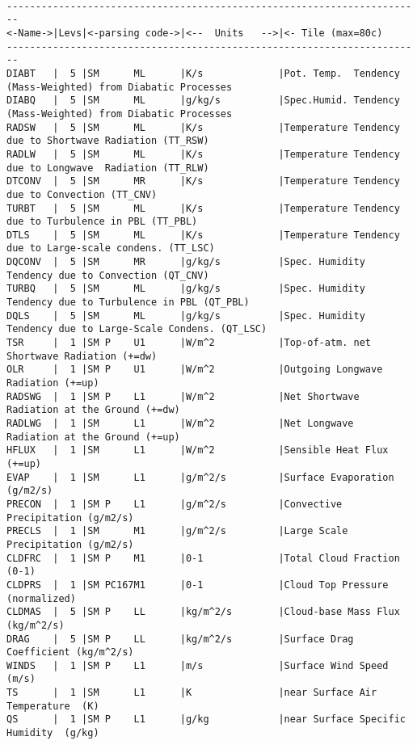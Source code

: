 {\footnotesize
\begin{verbatim}

------------------------------------------------------------------------
<-Name->|Levs|<-parsing code->|<--  Units   -->|<- Tile (max=80c) 
------------------------------------------------------------------------
DIABT   |  5 |SM      ML      |K/s             |Pot. Temp.  Tendency (Mass-Weighted) from Diabatic Processes
DIABQ   |  5 |SM      ML      |g/kg/s          |Spec.Humid. Tendency (Mass-Weighted) from Diabatic Processes
RADSW   |  5 |SM      ML      |K/s             |Temperature Tendency due to Shortwave Radiation (TT_RSW)
RADLW   |  5 |SM      ML      |K/s             |Temperature Tendency due to Longwave  Radiation (TT_RLW)
DTCONV  |  5 |SM      MR      |K/s             |Temperature Tendency due to Convection (TT_CNV)
TURBT   |  5 |SM      ML      |K/s             |Temperature Tendency due to Turbulence in PBL (TT_PBL)
DTLS    |  5 |SM      ML      |K/s             |Temperature Tendency due to Large-scale condens. (TT_LSC)
DQCONV  |  5 |SM      MR      |g/kg/s          |Spec. Humidity Tendency due to Convection (QT_CNV)
TURBQ   |  5 |SM      ML      |g/kg/s          |Spec. Humidity Tendency due to Turbulence in PBL (QT_PBL)
DQLS    |  5 |SM      ML      |g/kg/s          |Spec. Humidity Tendency due to Large-Scale Condens. (QT_LSC)
TSR     |  1 |SM P    U1      |W/m^2           |Top-of-atm. net Shortwave Radiation (+=dw)
OLR     |  1 |SM P    U1      |W/m^2           |Outgoing Longwave  Radiation (+=up)
RADSWG  |  1 |SM P    L1      |W/m^2           |Net Shortwave Radiation at the Ground (+=dw)
RADLWG  |  1 |SM      L1      |W/m^2           |Net Longwave  Radiation at the Ground (+=up)
HFLUX   |  1 |SM      L1      |W/m^2           |Sensible Heat Flux (+=up)
EVAP    |  1 |SM      L1      |g/m^2/s         |Surface Evaporation (g/m2/s)
PRECON  |  1 |SM P    L1      |g/m^2/s         |Convective  Precipitation (g/m2/s)
PRECLS  |  1 |SM      M1      |g/m^2/s         |Large Scale Precipitation (g/m2/s)
CLDFRC  |  1 |SM P    M1      |0-1             |Total Cloud Fraction (0-1)
CLDPRS  |  1 |SM PC167M1      |0-1             |Cloud Top Pressure (normalized)
CLDMAS  |  5 |SM P    LL      |kg/m^2/s        |Cloud-base Mass Flux  (kg/m^2/s)
DRAG    |  5 |SM P    LL      |kg/m^2/s        |Surface Drag Coefficient (kg/m^2/s)
WINDS   |  1 |SM P    L1      |m/s             |Surface Wind Speed  (m/s)
TS      |  1 |SM      L1      |K               |near Surface Air Temperature  (K)
QS      |  1 |SM P    L1      |g/kg            |near Surface Specific Humidity  (g/kg)

\end{verbatim}}
